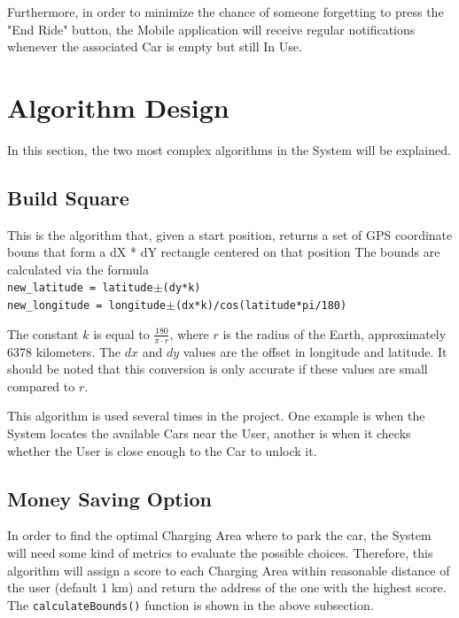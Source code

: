 \documentclass[12pt]{article}
\begin{document}
Furthermore, in order to minimize the chance of someone forgetting to press the "End Ride" button, the Mobile application will receive regular notifications whenever the associated Car is empty but still In Use.

\clearpage
\section{Algorithm Design}
In this section, the two most complex algorithms in the System will be explained.
\subsection{Build Square}
This is the algorithm that, given a start position, returns a set of GPS coordinate bouns that form a dX * dY rectangle centered on that position
The bounds are calculated via the formula\\
\verb&new_latitude = latitude&$\pm$\verb&(dy*k)&\\
\verb&new_longitude = longitude&$\pm$\verb&(dx*k)/cos(latitude*pi/180)&

The constant $k$ is equal to $\frac{180}{\pi\cdot r}$, where $r$ is the radius of the Earth, approximately 6378 kilometers. The $dx$ and $dy$ values are the offset in longitude and latitude. It should be noted that this conversion is only accurate if these values are small compared to $r$.

This algorithm is used several times in the project. One example is when the System locates the available Cars near the User, another is when it checks whether the User is close enough to the Car to unlock it.

\subsection{Money Saving Option}
In order to find the optimal Charging Area where to park the car, the System will need some kind of metrics to evaluate the possible choices. Therefore, this algorithm will assign a score to each Charging Area within reasonable distance of the user (default 1 km) and return the address of the one with the highest score. The \verb+calculateBounds()+ function is shown in the above subsection.
\end{document}
